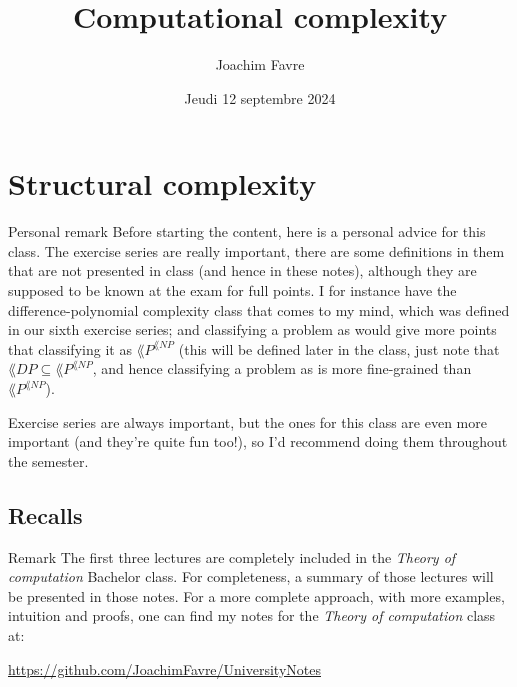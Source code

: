 \documentclass[a4paper]{article}
\title{Computational complexity}
\author{Joachim Favre}
\date{Jeudi 12 septembre 2024}
\begin{document}
\maketitle


\section{Structural complexity}

\begin{parag}{Personal remark}
    Before starting the content, here is a personal advice for this class. The exercise series are really important, there are some definitions in them that are not presented in class (and hence in these notes), although they are supposed to be known at the exam for full points. I for instance have the difference-polynomial complexity class  that comes to my mind, which was defined in our sixth exercise series; and classifying a problem as  would give more points that classifying it as $\lang{P}^{\lang{NP}}$ (this will be defined later in the class, just note that $\lang{DP} \subseteq \lang{P}^{\lang{NP}}$, and hence classifying a problem as  is more fine-grained than $\lang{P}^{\lang{NP}}$).

    Exercise series are always important, but the ones for this class are even more important (and they're quite fun too!), so I'd recommend doing them throughout the semester.
\end{parag}

\subsection{Recalls}

\begin{parag}{Remark}
    The first three lectures are completely included in the \textit{Theory of computation} Bachelor class. For completeness, a summary of those lectures will be presented in those notes. For a more complete approach, with more examples, intuition and proofs, one can find my notes for the \textit{Theory of computation} class at:
    \begin{center}
        \url{https://github.com/JoachimFavre/UniversityNotes}
    \end{center}
\end{parag}
\end{document}
